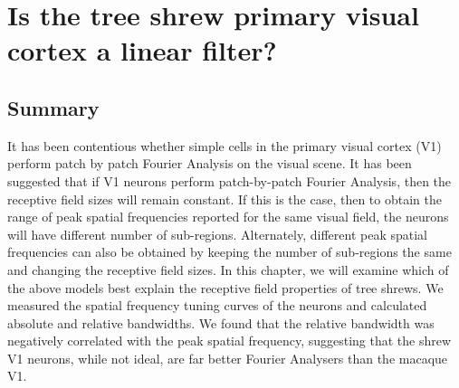 \chapter{Is the tree shrew primary visual cortex a linear filter?}
\pagebreak
	\section{Summary}
	It has been contentious whether simple cells in the primary visual cortex (V1) perform patch by patch Fourier Analysis on the visual scene. It has been suggested that if V1 neurons perform patch-by-patch Fourier Analysis, then the receptive field sizes will remain constant. If this is the case, then to obtain the range of peak spatial frequencies reported for the same visual field, the neurons will have different number of sub-regions. Alternately, different peak spatial frequencies can also be obtained by keeping the number of sub-regions the same and changing the receptive field sizes. In this chapter, we will examine which of the above models best explain the receptive field properties of tree shrews. We measured the spatial frequency tuning curves of the neurons and calculated absolute and relative bandwidths. We found that the relative bandwidth was negatively correlated with the peak spatial frequency, suggesting that the shrew V1 neurons, while not ideal, are far better Fourier Analysers than the macaque V1.
	\pagebreak
